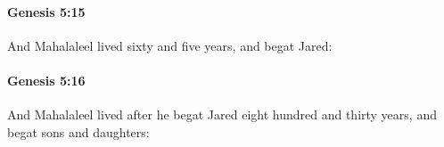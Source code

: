 		\paragraph{Genesis 5:15} %
			\label{GENESIS-5-15}

			And Mahalaleel lived sixty and five years, and begat Jared:


		\paragraph{Genesis 5:16} %
			\label{GENESIS-5-16}

			And Mahalaleel lived after he begat Jared eight hundred and thirty years, and begat sons and daughters:


